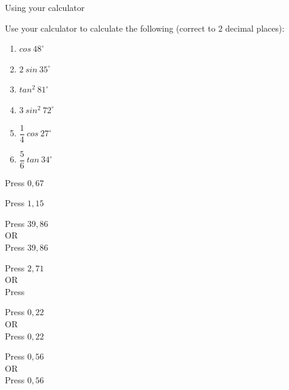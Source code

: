\begin{wex}{Using your calculator}

 {Use your calculator to calculate the following (correct to $2$ decimal places):
\begin{enumerate}[itemsep=4pt, label=\textbf{\arabic*}. ] 
 \item $cos~48^{\circ}$
\item $2~sin~35^{\circ}$
\item $tan^{2}~81^{\circ}$
\item $3~sin^{2}~72^{\circ}$
\item $\dfrac{1}{4}~cos~27^{\circ} $
\item $\dfrac{5}{6}~tan~34^{\circ}$
\end{enumerate}

}
{

\westep{}
Press   \fbox{\LARGE =} $0,67$

\westep{}
Press    \fbox{\LARGE =} $1,15$

\westep{}
Press \fbox{(}   \fbox{)}   \fbox{\LARGE =} $39,86$
\\
OR\\
Press   \fbox{\LARGE =}   \fbox{\LARGE =} $39,86$

\westep{}
Press  \fbox{(}   \fbox{)}  \fbox{\LARGE =} $2,71$
\\
OR\\
Press   \fbox{\LARGE =}   \fbox{\LARGE =}  \fbox{$\times$} 

\westep{}
Press \fbox{(}  \fbox{$\div$}  \fbox{)}   \fbox{\LARGE =} $0,22$
\\
OR\\
Press   \fbox{\LARGE =}  \fbox{$\div$}  \fbox{\LARGE =} $0,22$

\westep{}
Press \fbox{(}  \fbox{$\div$}  \fbox{)}   \fbox{\LARGE =} $0,56$
\\
OR\\
Press   \fbox{\LARGE =}  \fbox{$\times$}  \fbox{$\div$}  \fbox{\LARGE =} $0,56$

}
\end{wex}

